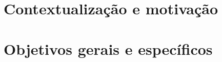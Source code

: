 \chapter{Contextualização e motivação}

\lipsum[21-22]

\chapter{Objetivos gerais e específicos}

\lipsum[24-25]